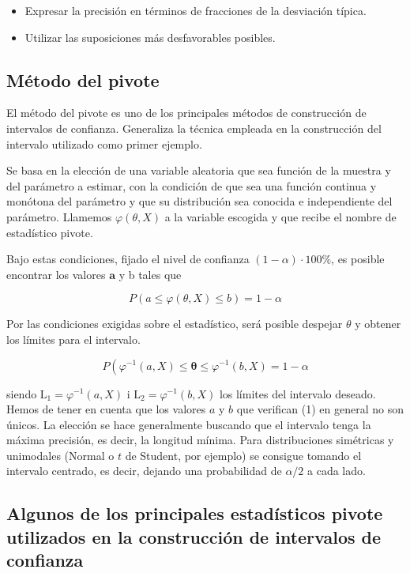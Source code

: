 \documentclass[
]{article}
\providecommand{\tightlist}{%
  \setlength{\itemsep}{0pt}\setlength{\parskip}{0pt}}
\begin{document}
\begin{itemize}
\tightlist
\item
  Expresar la precisión en términos de fracciones de la desviación típica.
\item
  Utilizar las suposiciones más desfavorables posibles.
\end{itemize}

\subsection{Método del pivote}\label{muxe9todo-del-pivote}

El método del pivote es uno de los principales métodos de construcción de intervalos de confianza. Generaliza la técnica empleada en la construcción del intervalo utilizado como primer ejemplo.

Se basa en la elección de una variable aleatoria que sea función de la muestra y del parámetro a estimar, con la condición de que sea una función continua y monótona del parámetro y que su distribución sea conocida e independiente del parámetro. Llamemos \(\varphi(\theta, X)\) a la variable escogida y que recibe el nombre de estadístico pivote.

Bajo estas condiciones, fijado el nivel de confianza \((1-\alpha) \cdot 100 \%\), es posible encontrar los valores \(\boldsymbol{a}\) y b tales que

\[
P(a \leq \varphi(\theta, X) \leq b)=1-\alpha
\]

Por las condiciones exigidas sobre el estadístico, será posible despejar \(\theta\) y obtener los límites para el intervalo.

\[
P\left(\varphi^{-1}(a, X) \leq \boldsymbol{\theta} \leq \varphi^{-1}(b, X)=1-\alpha\right.
\]

siendo \(\mathrm{L}_{1}=\varphi^{-1}(a, X)\) i \(\mathrm{L}_{2}=\varphi^{-1}(b, X)\) los límites del intervalo deseado.
Hemos de tener en cuenta que los valores \(a\) y \(b\) que verifican (1) en general no son únicos. La elección se hace generalmente buscando que el intervalo tenga la máxima precisión, es decir, la longitud mínima. Para distribuciones simétricas y unimodales (Normal o \(t\) de Student, por ejemplo) se consigue tomando el intervalo centrado, es decir, dejando una probabilidad de \(\alpha / 2\) a cada lado.

\subsection{Algunos de los principales estadísticos pivote utilizados en la construcción de intervalos de confianza}\label{algunos-de-los-principales-estaduxedsticos-pivote-utilizados-en-la-construcciuxf3n-de-intervalos-de-confianza}
\end{document}
